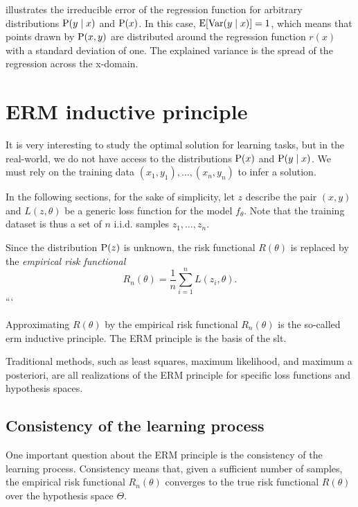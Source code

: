  illustrates the irreducible error of the
regression function for arbitrary distributions $\operatorname{P}(y \mid x)$ and $\operatorname{P}(x)$.
In this case, $\operatorname{E}\!\left[ \operatorname{Var}(y \mid x) \right] = 1$, which means that points drawn
by $\operatorname{P}(x, y)$ are distributed around the regression function $r(x)$ with a standard
deviation of one.  The explained variance is the spread of the regression across the
x-domain.

\section{ERM inductive principle}

It is very interesting to study the optimal solution for learning tasks, but in the
real-world, we do not have access to the distributions $\operatorname{P}(x)$ and $\operatorname{P}(y \mid x)$.
We must rely on the training data $(x_1, y_1), \dots, (x_n, y_n)$ to infer a solution.

In the following sections, for the sake of simplicity, let $z$ describe the pair $(x, y)$
and $L(z, \theta)$ be a generic loss function for the model $f_\theta$.  Note that the
training dataset is thus a set of $n$ i.i.d. samples $z_1, \dots, z_n$.

Since the distribution $\operatorname{P}(z)$ is unknown, the risk functional $R(\theta)$ is replaced by
the \emph{empirical risk functional}
\begin{equation}
  \label{eq:empirical-risk}
  R_n(\theta) = \frac{1}{n} \sum_{i=1}^n L(z_i, \theta)\text{.}
\end{equation}
```

Approximating $R(\theta)$ by the empirical risk functional $R_n(\theta)$ is the so-called
\gls{erm} inductive principle.  The ERM principle is the basis of the \gls{slt}.

Traditional methods, such as least squares, maximum likelihood, and maximum a posteriori, are
all realizations of the ERM principle for specific loss functions and hypothesis spaces.

\subsection{Consistency of the learning process}

One important question about the ERM principle is the consistency of the learning process.
Consistency means that, given a sufficient number of samples, the empirical risk
functional $R_n(\theta)$ converges to the true risk functional $R(\theta)$ over the
hypothesis space $\Theta$.


